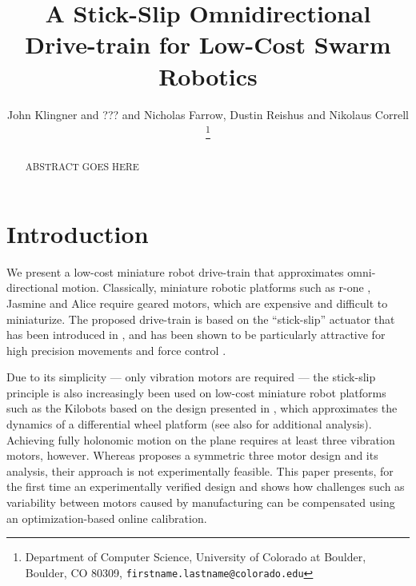 \documentclass[letterpaper, 10pt, conference]{ieeeconf}
\title{\LARGE \bf
A Stick-Slip Omnidirectional Drive-train for Low-Cost Swarm Robotics
}
\author{John Klingner and ??? and Nicholas Farrow, Dustin Reishus and Nikolaus Correll%
\thanks{Department of Computer Science,
University of Colorado at Boulder,
 Boulder, CO 80309,
{\tt\small firstname.lastname{@}colorado.edu}}%
}
\begin{document}
\maketitle


\begin{abstract}
ABSTRACT GOES HERE
\end{abstract}



\section{Introduction}
We present a low-cost miniature robot drive-train that approximates omni-directional motion. Classically, miniature robotic platforms such as r-one \cite{mclurkin2013low}, Jasmine \cite{jasmine} and Alice \cite{alice} require geared motors, which are expensive and difficult to miniaturize. The proposed drive-train is based on the ``stick-slip'' actuator that has been introduced in \cite{breguet1998stick}, and has been shown to be particularly attractive for high precision movements \cite{brufau2005micron,chu2006novel,martel2001three,martel2005fundamental,eigoli2012locomotion} and force control \cite{vartholomeos2008analysis}.   

Due to its simplicity --- only vibration motors are required --- the stick-slip principle is also increasingly been used on low-cost miniature robot platforms such as the Kilobots \cite{rubenstein2012kilobot} based on the design presented in \cite{Vartholomeos2006}, which approximates the dynamics of a differential wheel platform (see also \cite{spartali2013speed} for additional analysis). Achieving fully holonomic motion on the plane requires at least three vibration motors, however. Whereas \cite{Vartholomeos2005} proposes a symmetric three motor design and its analysis, their approach is not experimentally feasible. This paper presents, for the first time an experimentally verified design and shows how challenges such as variability between motors caused by manufacturing can be compensated using an optimization-based online calibration. 
\end{document}
